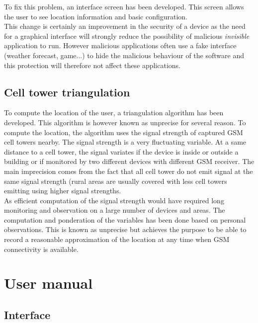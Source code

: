 To fix this problem, an interface screen has been developed.
This screen allows the user to see location information and basic configuration.\\

This change is certainly an improvement in the security of a device as the need for a graphical interface will strongly reduce the possibility of malicious \emph{invisible} application to run.
However malicious applications often use a fake interface (weather forecast, game...) to hide the malicious behaviour of the software and this protection will therefore not affect these applications.

\subsection{Cell tower triangulation}
\label{sec:dw-difficult-cell}

To compute the location of the user, a triangulation algorithm has been developed.
This algorithm is however known as unprecise for several reason.
To compute the location, the algorithm uses the signal strength of captured GSM cell towers nearby.
The signal strength is a very fluctuating variable.
At a same distance to a cell tower, the signal variates if the device is inside or outside a building or if monitored by two different devices with different GSM receiver.
The main imprecision comes from the fact that all cell tower do not emit signal at the same signal strength (rural areas are usually covered with less cell towers emitting using higher signal strengths.\\

As efficient computation of the signal strength would have required long monitoring and observation on a large number of devices and areas.
The computation and ponderation of the variables has been done based on personal observations.
This is known as unprecise but achieves the purpose to be able to record a reasonable approximation of the location at any time when GSM connectivity is available.\\

\section{User manual}

\subsection{Interface}
\label{sec:dw-gui}

